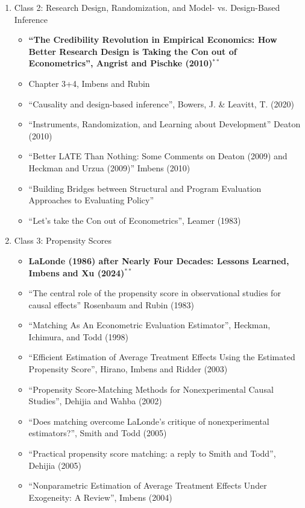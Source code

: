 \documentclass[11pt, a4paper]{article}
\begin{document}
\begin{enumerate}
\begin{enumerate}
\begin{itemize}
    \item ``The Identification Zoo: Meanings of Identification in Econometrics'', Lewbel, 2019
    \end{itemize}
  \item Class 2: Research Design, Randomization, and Model- vs. Design-Based Inference
    \begin{itemize}
      \item \textbf{``The Credibility Revolution in Empirical Economics: How Better Research Design is Taking the Con out of Econometrics'', Angrist and Pischke (2010)}$^{**}$
    \item Chapter 3+4, Imbens and Rubin
    \item ``Causality and design-based inference'', Bowers, J. \& Leavitt, T. (2020)
    \item ``Instruments, Randomization, and
      Learning about Development'' Deaton (2010)
    \item ``Better LATE Than Nothing: Some Comments on Deaton (2009) and Heckman and Urzua (2009)'' Imbens (2010)
    \item ``Building Bridges between Structural and Program Evaluation Approaches to Evaluating Policy''
    \item ``Let's take the Con out of Econometrics'', Leamer (1983)
    \end{itemize}
  \item Class 3: Propensity Scores
    \begin{itemize}
      \item \textbf{LaLonde (1986) after Nearly Four Decades:
Lessons Learned, Imbens and Xu (2024)}$^{**}$
    \item ``The central role of the propensity score in observational
      studies for causal effects'' Rosenbaum and Rubin (1983)
    \item ``Matching As An Econometric Evaluation Estimator'', Heckman, Ichimura, and Todd (1998)
    \item ``Efficient Estimation of Average Treatment Effects Using the Estimated Propensity Score'', Hirano, Imbens and Ridder (2003)
    \item ``Propensity Score-Matching Methods for Nonexperimental Causal Studies'', Dehijia and Wahba (2002)
    \item ``Does matching overcome LaLonde's critique of nonexperimental estimators?'', Smith and Todd (2005)
    \item ``Practical propensity score matching: a reply to Smith and Todd'', Dehijia (2005)
    \item ``Nonparametric Estimation of Average Treatment Effects Under Exogeneity: A Review'', Imbens (2004)

\end{itemize}
\end{enumerate}
\end{enumerate}
\end{document}
